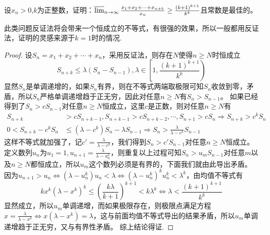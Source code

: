 \documentclass[../../main.tex]{subfiles}
\begin{document}
\begin{example}
设\(x_n>0\),\(k\)为正整数，证明：\(\varlimsup_{n\rightarrow\infty}\frac{x_1 + x_2+\cdots + x_{n + k}}{x_n}\geq\frac{(k + 1)^{k + 1}}{k^k}\)且常数是最佳的。
\end{example}
\begin{note}
此类问题反证法将会带来一个恒成立的不等式，有很强的效果，所以一般都用反证法，证明的灵感来源于\(k = 1\)时的情况.
\end{note}
\begin{proof}
设\(S_n=x_1 + x_2+\cdots + x_n\)，采用反证法，则存在\(N\)使得\(n\geq N\)时恒成立
\[S_{n + k}\leq\lambda(S_n - S_{n - 1}),\lambda\in\left[1,\frac{(k + 1)^{k + 1}}{k^k}\right)\]
显然\(S_n\)是单调递增的，如果\(S_n\)有界，则在不等式两端取极限可知\(S_n\)收敛到零，矛盾，所以\(S_n\)严格单调递增趋于正无穷，因此对任意\(n\geq N\)有\(S_n>S_{n - 1}\)。
如果已经得到了\(S_n>cS_{n - 1}\)对任意\(n\geq N\)恒成立，这里\(c\)是正数，则对任意\(n\geq N\)有
\begin{align*}
S_{n + k}&>cS_{n + k - 1},S_{n + k - 1}>cS_{n + k - 2},\cdots,S_{n + 1}>cS_n\Rightarrow S_{n + k}>c^kS_n\\
0<S_{n + k}-c^kS_n&\leq(\lambda - c^k)S_n-\lambda S_{n - 1}\Rightarrow S_n>\frac{\lambda}{\lambda - c^k}S_{n - 1}
\end{align*}
这样不等式就加强了，记\(c'=\frac{\lambda}{\lambda - c^k}\)，我们得到\(S_n>c'S_{n - 1}\)对任意\(n\geq N\)恒成立。
定义数列\(u_n\)为\(u_1 = 1,u_{n + 1}=\frac{\lambda}{\lambda - u_n^k}\)，则重复以上过程可知\(S_n>u_mS_{n - 1}\)对任意\(m\)以及\(n\geq N\)都恒成立，所以\(u_m\)这个数列必须是有界的，下面我们就由此导出矛盾。
因为\(u_{n + 1}>u_n\Leftrightarrow(\lambda - u_n^k)u_n<\lambda\Leftrightarrow(\lambda - u_n^k)^ku_n^k<\lambda^k\)，由均值不等式有
\[kx^k(\lambda - x^k)^k\leq\left(\frac{k\lambda}{k + 1}\right)^{k + 1}<k\lambda^k\Leftrightarrow\lambda<\frac{(k + 1)^{k + 1}}{k^k}\]
显然成立，所以\(u_m\)单调递增，而如果极限存在，则极限点满足方程\(x=\frac{\lambda}{\lambda - x^k}\Leftrightarrow x(\lambda - x^k)=\lambda\)，这与前面均值不等式导出的结果矛盾，所以\(u_m\)单调递增趋于正无穷，又与有界性矛盾。
综上结论得证.
\end{proof}
\end{document}
